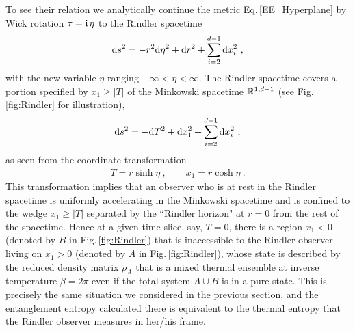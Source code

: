 To see their relation we analytically continue the metric Eq.\,\eqref{EE_Hyperplane} by Wick rotation $\tau = \mathrm{i} \,\eta$ to the Rindler spacetime
\begin{align}
	\mathrm{d} s^{2} = - r^{2} \mathrm{d}\eta^{2} + \mathrm{d} r^{2} + \sum_{i=2}^{d-1} \mathrm{d} x_i^2\ ,
\end{align}
with the new variable $\eta$ ranging $-\infty < \eta < \infty$.
The Rindler spacetime covers a portion specified by $x_1 \ge |T| $ of the Minkowski spacetime $\mathbb{R}^{1,d-1}$ (see Fig.\,\ref{fig:Rindler} for illustration),
\begin{align}
	\mathrm{d} s^{2} = -\mathrm{d} T^{2} + \mathrm{d} x_1^{2} + \sum_{i=2}^{d-1} \mathrm{d} x_i^2\ ,
\end{align}
as seen from the coordinate transformation
\begin{align}
	T = r \sinh \eta \ , \qquad x_1 = r \cosh \eta \ .
\end{align}
This transformation implies that an observer who is at rest in the Rindler spacetime is uniformly accelerating in the Minkowski spacetime and is confined to the wedge $x_1 \ge |T| $ separated by the ``Rindler horizon" at $r=0$ from the rest of the spacetime.
Hence at a given time slice, say, $T=0$, there is a region $x_1<0$ (denoted by $B$ in Fig.\,\ref{fig:Rindler}) that is inaccessible to the Rindler observer living on $x_1>0$ (denoted by $A$ in Fig.\,\ref{fig:Rindler}),
whose state is described by the reduced density matrix $\rho_A$ that is a mixed thermal ensemble at inverse temperature $\beta = 2\pi$ even if the total system $A\cup B$ is in a pure state.
This is precisely the same situation we considered in the previous section, and 
the entanglement entropy calculated there is equivalent to the thermal entropy that the Rindler observer measures in her/his frame.

